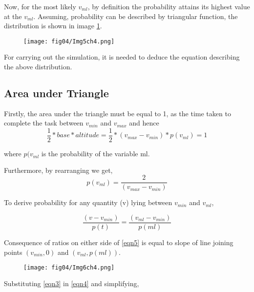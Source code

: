 Now, for the most likely $v_ {ml}$, by definition the probability attains its highest value at the $v_ {ml}$. Assuming, probability can be described by triangular function, the distribution is shown in image \ref{img5ch4}.

\begin{figure}
	\centering
	\texttt{[image: fig04/Img5ch4.png]}
	\label{img5ch4}
\end{figure}

For carrying out the simulation, it is needed to deduce the equation describing the above distribution.


\subsection{Area under Triangle}

Firstly, the area under the triangle must be equal to 1, as the time taken to complete the task between $ v_{min} $ and $ v_{max} $ and hence 
\begin{equation}
\frac{1}{2} * base * altitude = \frac{1}{2} * (v_{max} - v_{min} ) * p(v_{ml}) = 1
\label{eqn3}
\end{equation}

where $p(v_{ml} $ is the probability of the variable ml.

Furthermore, by rearranging we get, 
\begin{equation}
p(v_{ml}) = \frac{2}{  (v_{max} - v_{min})} 
\label{eqn4}
\end{equation}

To derive probability for any quantity (v) lying between $ v_{min} $ and $ v_{ml} $, 

\begin{equation}
\frac{(v - v_{min})}{ p(t) }  = \frac{(v_{ml} - v_{min})}{ p(ml) } 
\label{eqn5}
\end{equation}

Consequence of ratios on either side of \ref{eqn5} is equal to slope of line joining points $(v_{min}, 0)$ and $( v_{ml}, p(ml) )$.

\begin{figure}
	\centering
	\texttt{[image: fig04/Img6ch4.png]}
	\mycaption[MC]{}
	\label{img6ch4}
\end{figure}


Substituting \ref{eqn3} in \ref{eqn4} and simplifying,

